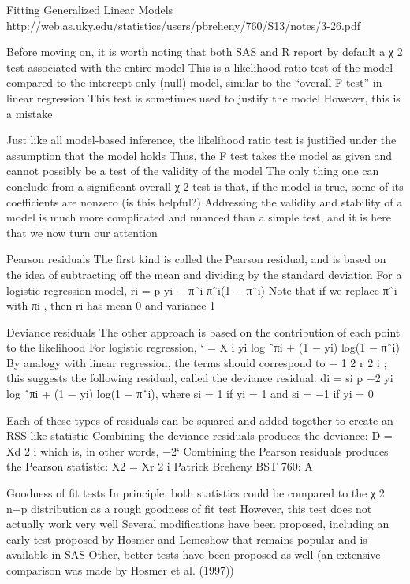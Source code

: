 Fitting Generalized Linear Models
http://web.as.uky.edu/statistics/users/pbreheny/760/S13/notes/3-26.pdf

Before moving on, it is worth noting that both SAS and R
report by default a χ
2
test associated with the entire model
This is a likelihood ratio test of the model compared to the
intercept-only (null) model, similar to the “overall F test” in
linear regression
This test is sometimes used to justify the model
However, this is a mistake

Just like all model-based inference, the likelihood ratio test is
justified under the assumption that the model holds
Thus, the F test takes the model as given and cannot
possibly be a test of the validity of the model
The only thing one can conclude from a significant overall χ
2
test is that, if the model is true, some of its coefficients are
nonzero (is this helpful?)
Addressing the validity and stability of a model is much more
complicated and nuanced than a simple test, and it is here
that we now turn our attention

Pearson residuals
The first kind is called the Pearson residual, and is based on
the idea of subtracting off the mean and dividing by the
standard deviation
For a logistic regression model,
ri = p
yi − πˆi
πˆi(1 − πˆi)
Note that if we replace πˆi with πi
, then ri has mean 0 and
variance 1

Deviance residuals
The other approach is based on the contribution of each point
to the likelihood
For logistic regression,
` =
X
i
{yi
log ˆπi + (1 − yi) log(1 − πˆi)}
By analogy with linear regression, the terms should correspond
to −
1
2
r
2
i
; this suggests the following residual, called the
deviance residual:
di = si
p
−2 {yi
log ˆπi + (1 − yi) log(1 − πˆi)},
where si = 1 if yi = 1 and si = −1 if yi = 0


Each of these types of residuals can be squared and added
together to create an RSS-like statistic
Combining the deviance residuals produces the deviance:
D =
Xd
2
i
which is, in other words, −2`
Combining the Pearson residuals produces the Pearson
statistic:
X2 =
Xr
2
i
Patrick Breheny BST 760: A

Goodness of fit tests
In principle, both statistics could be compared to the χ
2
n−p
distribution as a rough goodness of fit test
However, this test does not actually work very well
Several modifications have been proposed, including an early
test proposed by Hosmer and Lemeshow that remains popular
and is available in SAS
Other, better tests have been proposed as well (an extensive
comparison was made by Hosmer et al. (1997))


